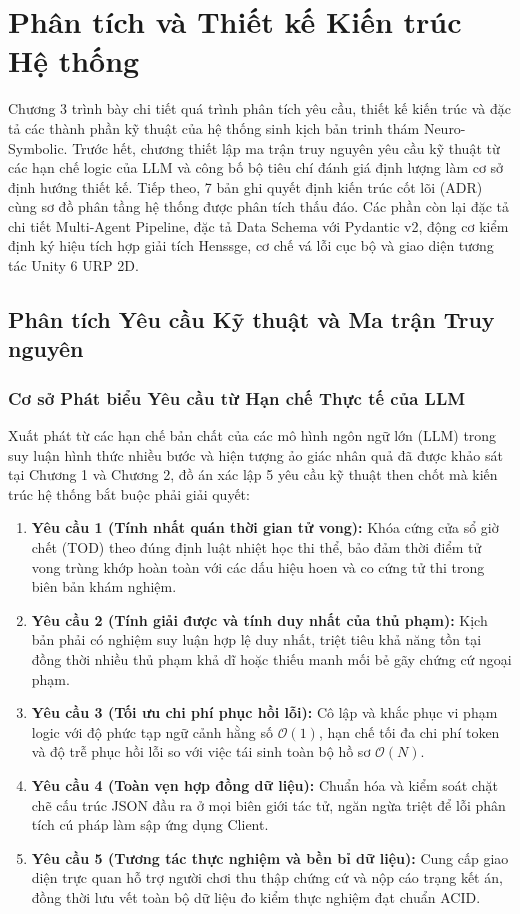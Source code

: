 \chapter{Phân tích và Thiết kế Kiến trúc Hệ thống}
\label{ch:architecture}

Chương 3 trình bày chi tiết quá trình phân tích yêu cầu, thiết kế kiến trúc và đặc tả các thành phần kỹ thuật của hệ thống sinh kịch bản trinh thám Neuro-Symbolic. Trước hết, chương thiết lập ma trận truy nguyên yêu cầu kỹ thuật từ các hạn chế logic của LLM và công bố bộ tiêu chí đánh giá định lượng làm cơ sở định hướng thiết kế. Tiếp theo, 7 bản ghi quyết định kiến trúc cốt lõi (ADR) cùng sơ đồ phân tầng hệ thống được phân tích thấu đáo. Các phần còn lại đặc tả chi tiết Multi-Agent Pipeline, đặc tả Data Schema với Pydantic v2, động cơ kiểm định ký hiệu tích hợp giải tích Henssge, cơ chế vá lỗi cục bộ và giao diện tương tác Unity 6 URP 2D.

\section{Phân tích Yêu cầu Kỹ thuật và Ma trận Truy nguyên}
\label{sec:arch_requirements}

\subsection{Cơ sở Phát biểu Yêu cầu từ Hạn chế Thực tế của LLM}
Xuất phát từ các hạn chế bản chất của các mô hình ngôn ngữ lớn (LLM) trong suy luận hình thức nhiều bước và hiện tượng ảo giác nhân quả đã được khảo sát tại Chương 1 và Chương 2, đồ án xác lập 5 yêu cầu kỹ thuật then chốt mà kiến trúc hệ thống bắt buộc phải giải quyết:
\begin{enumerate}[leftmargin=1.5cm]
    \item \textbf{Yêu cầu 1 (Tính nhất quán thời gian tử vong):} Khóa cứng cửa sổ giờ chết (TOD) theo đúng định luật nhiệt học thi thể, bảo đảm thời điểm tử vong trùng khớp hoàn toàn với các dấu hiệu hoen và co cứng tử thi trong biên bản khám nghiệm.
    \item \textbf{Yêu cầu 2 (Tính giải được và tính duy nhất của thủ phạm):} Kịch bản phải có nghiệm suy luận hợp lệ duy nhất, triệt tiêu khả năng tồn tại đồng thời nhiều thủ phạm khả dĩ hoặc thiếu manh mối bẻ gãy chứng cứ ngoại phạm.
    \item \textbf{Yêu cầu 3 (Tối ưu chi phí phục hồi lỗi):} Cô lập và khắc phục vi phạm logic với độ phức tạp ngữ cảnh hằng số $\mathcal{O}(1)$, hạn chế tối đa chi phí token và độ trễ phục hồi lỗi so với việc tái sinh toàn bộ hồ sơ $\mathcal{O}(N)$.
    \item \textbf{Yêu cầu 4 (Toàn vẹn hợp đồng dữ liệu):} Chuẩn hóa và kiểm soát chặt chẽ cấu trúc JSON đầu ra ở mọi biên giới tác tử, ngăn ngừa triệt để lỗi phân tích cú pháp làm sập ứng dụng Client.
    \item \textbf{Yêu cầu 5 (Tương tác thực nghiệm và bền bỉ dữ liệu):} Cung cấp giao diện trực quan hỗ trợ người chơi thu thập chứng cứ và nộp cáo trạng kết án, đồng thời lưu vết toàn bộ dữ liệu đo kiểm thực nghiệm đạt chuẩn ACID.
\end{enumerate}

